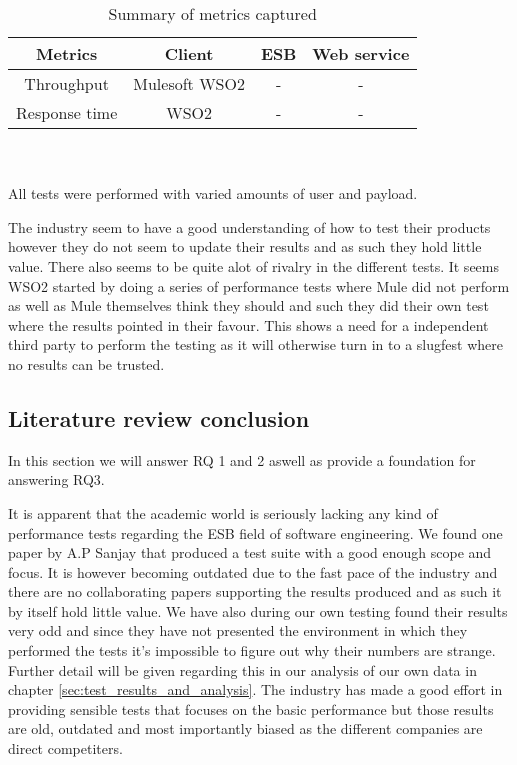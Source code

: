 \begin{table}[H]
	\caption{Summary of metrics captured}
	\begin{tabular}{c c c c}
	Metrics &  Client & ESB & Web service \\
	\hline
	Throughput & Mulesoft \cite{mulesoft08} WSO2 \cite{Perera07R2,Perera07R3} & - & - \\
	Response time & WSO2 \cite{Perera07} & - & - \\
	\hline
	\end{tabular}
	\\
	\\
	All tests were performed with varied amounts of user and payload.
\end{table}

The industry seem to have a good understanding of how to test their products however they do not seem to update their results and as such they hold little value.
There also seems to be quite alot of rivalry in the different tests. 
It seems WSO2 started by doing a series of performance tests where Mule did not perform as well as Mule themselves think they should and such they did their own test where the results pointed in their favour.
This shows a need for a independent third party to perform the testing as it will otherwise turn in to a slugfest where no results can be trusted. 

\subsection{Literature review conclusion}
In this section we will answer RQ 1 and 2 aswell as provide a foundation for answering RQ3.

It is apparent that the academic world is seriously lacking any kind of performance tests regarding the ESB field of software engineering. 
We found one paper by A.P Sanjay \cite{Sanjay2011} that produced a test suite with a good enough scope and focus. 
It is however becoming outdated due to the fast pace of the industry and there are no collaborating papers supporting the results produced and as such it by itself hold little value. 
We have also during our own testing found their results very odd and since they have not presented the environment in which they performed the tests it's impossible to figure out why their numbers are strange. 
Further detail will be given regarding this in our analysis of our own data in chapter \ref{sec:test_results_and_analysis}.
The industry has made a good effort in providing sensible tests that focuses on the basic performance but those results are old, outdated and most importantly biased as the different companies are direct competiters. 

